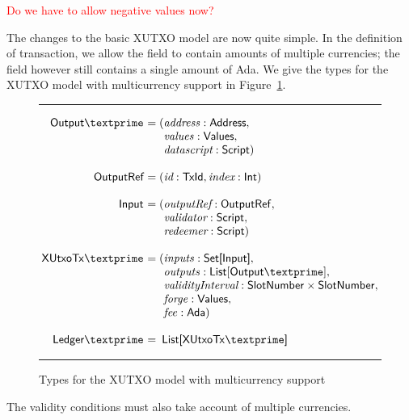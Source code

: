 \documentclass[a4paper]{article}
\newcommand{\red}[1]{\textcolor{red}{#1}}
\renewcommand{\i}{\textit}  %
\newcommand{\s}{\textsf}  %
\theoremstyle{definition}  %
\newenvironment{arraydefs}[1]{\setlength{\arraycolsep}{0pt}\begin{array}{#1}}{\end{array}}
\newenvironment{ruledfigure}[1]{\begin{figure}[#1]\hrule\vspace{10pt}}{\vspace{10pt}\hrule\end{figure}}
\begin{document}
\noindent \red{Do we have to allow negative values now?}

\noindent The changes to the basic XUTXO model are now quite simple.
In the definition of transaction, we allow the \forge{} field to
contain amounts of multiple currencies; the \fee{} field however still
contains a single amount of \s{Ada}. We give the types for the XUTXO
model with multicurrency support in Figure~\ref{fig:mc-xutxo-types}.

\begin{ruledfigure}{H}
  \[
  \begin{arraydefs}{rll}
    \s{Output\textprime } &= (&\addr: \s{Address},\\
    && \vals: \s{Values},\\
    && \i{datascript}: \s{Script})\\
    \\
    \s{OutputRef } &= (&\i{id}: \s{TxId}, \i{index}: \s{Int})\\
    \\
    \s{Input } &= (& \i{outputRef}: \sf{OutputRef},\\
                     && \i{validator}: \s{Script},\\
                     & & \i{redeemer}: \s{Script})\\
\\
    \xutxotx\textprime\s{ } &= ( &\inputs: \s{Set[Input]},\\
    &&\outputs: \mathsf{List[Output\textprime]},\\
    &&\i{validityInterval}: \slotnum \times \slotnum,\\
    &&\forge: \s{Values}, \\
    &&\fee: \s{Ada})\\
    \\
    \s{Ledger\textprime } &=&\!\s{List[}\xutxotx\textprime\s{]}\\
\end{arraydefs}
  \]
  \caption{Types for the XUTXO model with multicurrency support}
  \label{fig:mc-xutxo-types}
\end{ruledfigure}


  
\noindent The validity conditions must also take account of 
multiple currencies.  
\end{document}
